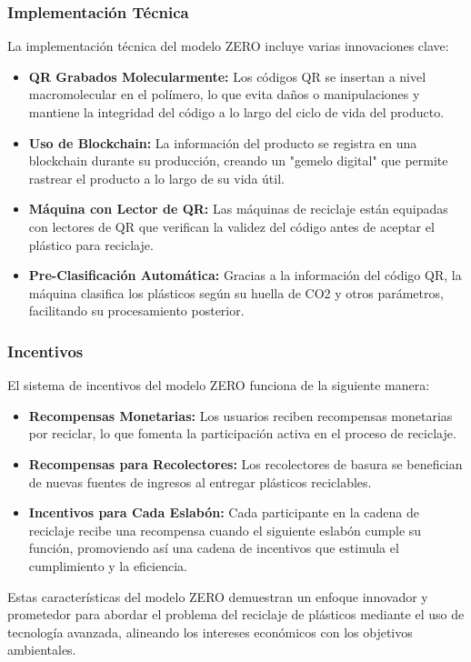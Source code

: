 \documentclass[main.tex]{subfiles}
\begin{document}
\subsubsection{Implementación Técnica}
La implementación técnica del modelo ZERO incluye varias innovaciones clave:
\begin{itemize}
    \item \textbf{QR Grabados Molecularmente:} Los códigos QR se insertan a nivel macromolecular en el polímero, lo que evita daños o manipulaciones y mantiene la integridad del código a lo largo del ciclo de vida del producto.
    \item \textbf{Uso de Blockchain:} La información del producto se registra en una blockchain durante su producción, creando un "gemelo digital" que permite rastrear el producto a lo largo de su vida útil.
    \item \textbf{Máquina con Lector de QR:} Las máquinas de reciclaje están equipadas con lectores de QR que verifican la validez del código antes de aceptar el plástico para reciclaje.
    \item \textbf{Pre-Clasificación Automática:} Gracias a la información del código QR, la máquina clasifica los plásticos según su huella de CO2 y otros parámetros, facilitando su procesamiento posterior.
\end{itemize}

\subsubsection{Incentivos}
El sistema de incentivos del modelo ZERO funciona de la siguiente manera:
\begin{itemize}
    \item \textbf{Recompensas Monetarias:} Los usuarios reciben recompensas monetarias por reciclar, lo que fomenta la participación activa en el proceso de reciclaje.
    \item \textbf{Recompensas para Recolectores:} Los recolectores de basura se benefician de nuevas fuentes de ingresos al entregar plásticos reciclables.
    \item \textbf{Incentivos para Cada Eslabón:} Cada participante en la cadena de reciclaje recibe una recompensa cuando el siguiente eslabón cumple su función, promoviendo así una cadena de incentivos que estimula el cumplimiento y la eficiencia.
\end{itemize}

Estas características del modelo ZERO demuestran un enfoque innovador y prometedor para abordar el problema del reciclaje de plásticos mediante el uso de tecnología avanzada, alineando los intereses económicos con los objetivos ambientales.
\end{document}
